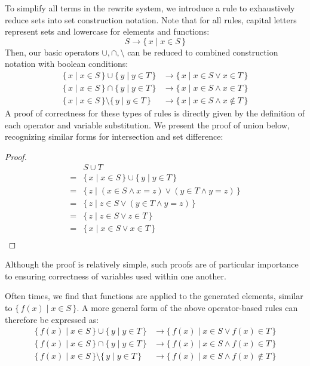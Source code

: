 \documentclass{article}
\newcommand{\Set}[2]{%
  \{\, #1 \mid #2 \, \}%
}
\begin{document}
To simplify all terms in the rewrite system, we introduce a rule to exhaustively reduce sets into set construction notation. Note that for all rules, capital letters represent sets and lowercase for elements and functions:
\begin{equation}
S \rightarrow \Set{x}{x \in S}
\end{equation}
Then, our basic operators $\cup, \cap, \setminus$ can be reduced to combined construction notation with boolean conditions:
\begin{align}
  \Set{x}{x \in S} \cup \Set{y}{y \in T} &\rightarrow \Set{x}{x \in S \lor x \in T}\\
  \Set{x}{x \in S} \cap \Set{y}{y \in T} &\rightarrow \Set{x}{x \in S \land x \in T}\\
  \Set{x}{x \in S} \setminus \Set{y}{y \in T} &\rightarrow \Set{x}{x \in S \land x \notin T}
\end{align}
A proof of correctness for these types of rules is directly given by the definition of each operator and variable substitution. We present the proof of union below, recognizing similar forms for intersection and set difference:
\begin{proof}
  \begin{align*}
    &S \cup T\\
    =&\Set{x}{x \in S} \cup \Set{y}{y \in T}\\
    =&\Set{z}{(x \in S \land x = z) \lor (y \in T \land y = z)}\\
    =&\Set{z}{z \in S \lor (y \in T \land y = z)}\\
    =&\Set{z}{z \in S \lor z \in T}\\
    =&\Set{x}{x \in S \lor x \in T}\\
  \end{align*}
\end{proof}
Although the proof is relatively simple, such proofs are of particular importance to ensuring correctness of variables used within one another.

Often times, we find that functions are applied to the generated elements, similar to $\Set{f(x)}{x \in S}$. A more general form of the above operator-based rules can therefore be expressed as:
\begin{align}
  \Set{f(x)}{x \in S} \cup \Set{y}{y \in T} &\rightarrow \Set{f(x)}{x \in S \lor f(x) \in T}\\
  \Set{f(x)}{x \in S} \cap \Set{y}{y \in T} &\rightarrow \Set{f(x)}{x \in S \land f(x) \in T}\\
  \Set{f(x)}{x \in S} \setminus \Set{y}{y \in T} &\rightarrow \Set{f(x)}{x \in S \land f(x) \notin T}
\end{align}
\end{document}
